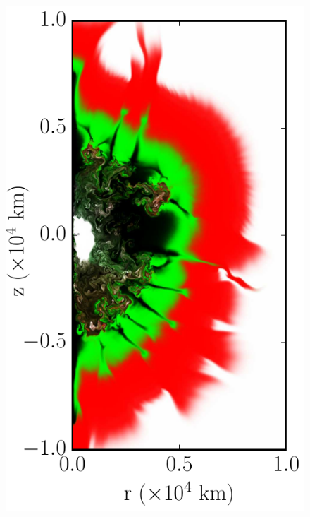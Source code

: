 \documentclass[iop,apj]{emulateapj}
\begin{document}
\begin{figure}[!ht]
\begin{minipage}{0.24\textwidth}
    \includegraphics[width=\linewidth]{"figures/flash_simulations/delayed-core/mpole-16_amp-12/cone_400k_m16_a12_0190"}
  \end{minipage} \hfill 
  \begin{minipage}{0.24\textwidth}

\end{minipage}
\end{figure}
\end{document}
